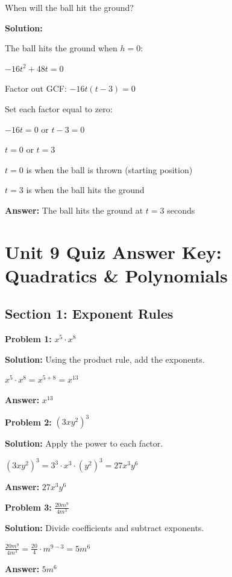 \documentclass[12pt]{article}
\begin{document}
		When will the ball hit the ground?
		
		\textbf{Solution:}
		
		The ball hits the ground when $h = 0$:
		
		$-16t^2 + 48t = 0$
		
		Factor out GCF: $-16t(t - 3) = 0$
		
		Set each factor equal to zero:
		
		$-16t = 0$ or $t - 3 = 0$
		
		$t = 0$ or $t = 3$
		
		$t = 0$ is when the ball is thrown (starting position)
		
		$t = 3$ is when the ball hits the ground
		
		\textbf{Answer:} The ball hits the ground at $t = 3$ seconds

\newpage

\section*{Unit 9 Quiz Answer Key: Quadratics \& Polynomials}

	\subsection*{Section 1: Exponent Rules}

		\textbf{Problem 1:} $x^5 \cdot x^8$
		
		\textbf{Solution:} Using the product rule, add the exponents.
		
		$x^5 \cdot x^8 = x^{5+8} = x^{13}$
		
		\textbf{Answer:} $x^{13}$

		\vspace{0.5cm}

		\textbf{Problem 2:} $(3xy^2)^3$
		
		\textbf{Solution:} Apply the power to each factor.
		
		$(3xy^2)^3 = 3^3 \cdot x^3 \cdot (y^2)^3 = 27x^3y^6$
		
		\textbf{Answer:} $27x^3y^6$

		\vspace{0.5cm}

		\textbf{Problem 3:} $\frac{20m^9}{4m^3}$
		
		\textbf{Solution:} Divide coefficients and subtract exponents.
		
		$\frac{20m^9}{4m^3} = \frac{20}{4} \cdot m^{9-3} = 5m^6$
		
		\textbf{Answer:} $5m^6$
\end{document}
